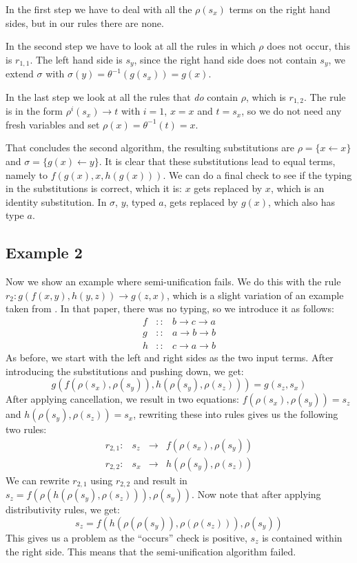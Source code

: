 In the first step we have to deal with all the $\rho(s_x)$ terms on the right hand sides, but in our rules there are none. 

In the second step we have to look at all the rules in which $\rho$ does not occur, this is $r_{1,1}$. The left hand side is $s_y$, since the right hand side does not contain $s_y$, we extend $\sigma$ with $\sigma(y) = \theta^{-1}(g(s_x)) = g(x)$.

In the last step we look at all the rules that \textit{do} contain $\rho$, which is $r_{1,2}$. The rule is in the form $\rho^i(s_x) \rightarrow t$ with $i=1$, $x = x$ and $t = s_x$, so we do not need any fresh variables and set $\rho(x) = \theta^{-1}(t) = x$.

That concludes the second algorithm, the resulting substitutions are $\rho = \{ x \leftarrow x \}$ and $\sigma = \{ g(x) \leftarrow y \}$. It is clear that these substitutions lead to equal terms, namely to $f(g(x), x, h(g(x)))$. We can do a final check to see if the typing in the substitutions is correct, which it is: $x$ gets replaced by $x$, which is an identity substitution. In $\sigma$, $y$, typed $a$, gets replaced by $g(x)$, which also has type $a$. 
\subsection*{Example 2}
Now we show an example where semi-unification fails. We do this with the rule $r_2 : g(f(x, y), h(y, z)) \rightarrow g(z, x)$, which is a slight variation of an example taken from \cite{SemiUnification}. In that paper, there was no typing, so we introduce it as follows:
$$
\begin{array}{rcl}
    f & :: & b \rightarrow c \rightarrow a \\
    g & :: & a \rightarrow b \rightarrow b \\
    h & :: & c \rightarrow a \rightarrow b 
\end{array}
$$
As before, we start with the left and right sides as the two input terms. After introducing the substitutions and pushing down, we get:
$$g(f(\rho(s_x), \rho(s_y)), h(\rho(s_y), \rho(s_z))) = g(s_z, s_x)$$
After applying cancellation, we result in two equations: $f(\rho(s_x), \rho(s_y)) = s_z$ and $h(\rho(s_y), \rho(s_z)) = s_x$, rewriting these into rules gives us the following two rules: 
$$
\begin{array}{lrcl}
    r_{2,1}: & s_z & \rightarrow & f(\rho(s_x), \rho(s_y)) \\
    r_{2,2}: & s_x & \rightarrow & h(\rho(s_y), \rho(s_z))
\end{array}
$$
We can rewrite $r_{2,1}$ using $r_{2,2}$ and result in $s_z = f(\rho(h(\rho(s_y), \rho(s_z))), \rho(s_y))$. Now note that after applying distributivity rules, we get: $$s_z = f(h(\rho(\rho(s_y)), \rho(\rho(s_z))), \rho(s_y))$$
This gives us a problem as the ``occurs'' check is positive, $s_z$ is contained within the right side. This means that the semi-unification algorithm failed.
